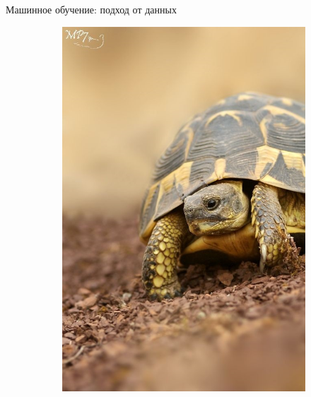 \documentclass[aspectratio=169]{beamer}
\begin{document}
\begin{frame}{Машинное обучение: подход от данных}
\begin{figure}
\begin{subfigure}[b]{.1\linewidth}
            \includegraphics[width=\linewidth]{graphs/fig14_2.jpg}
        \end{subfigure}
        \begin{subfigure}[b]{.1\linewidth}

\end{subfigure}
\end{figure}
\end{frame}
\end{document}
